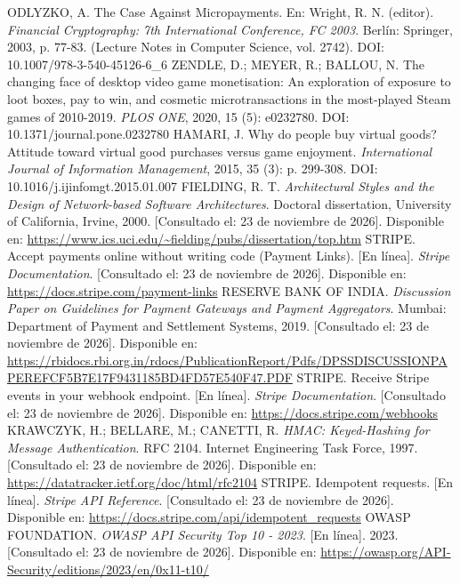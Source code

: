 \documentclass[12pt]{article}
\makeatletter
\newcommand\onceUnoQuince{\fontsize{11bp}{14.5475bp}\selectfont}  %
\newenvironment{referencias}{%
  \list{\@biblabel{\@arabic\c@enumiv}}{%
    \settowidth\labelwidth{[99]}%
    \leftmargin\labelwidth \advance\leftmargin\labelsep
    \itemsep=4bp \parsep=0pt \topsep=0pt \partopsep=0pt
    \usecounter{enumiv}\let\p@enumiv\@empty
    \renewcommand\theenumiv{\@arabic\c@enumiv}}%
  \onceUnoQuince \sloppy}{\endlist}
\makeatother
\begin{document}
\begin{referencias}
 ODLYZKO, A. The Case Against Micropayments. En: Wright, R. N. (editor). \textit{Financial Cryptography: 7th International Conference, FC 2003}. Berlín: Springer, 2003, p. 77-83. (Lecture Notes in Computer Science, vol. 2742). DOI: 10.1007/978-3-540-45126-6\_6
 ZENDLE, D.; MEYER, R.; BALLOU, N. The changing face of desktop video game monetisation: An exploration of exposure to loot boxes, pay to win, and cosmetic microtransactions in the most-played Steam games of 2010-2019. \textit{PLOS ONE}, 2020, 15 (5): e0232780. DOI: 10.1371/journal.pone.0232780
 HAMARI, J. Why do people buy virtual goods? Attitude toward virtual good purchases versus game enjoyment. \textit{International Journal of Information Management}, 2015, 35 (3): p. 299-308. DOI: 10.1016/j.ijinfomgt.2015.01.007
 FIELDING, R. T. \textit{Architectural Styles and the Design of Network-based Software Architectures}. Doctoral dissertation, University of California, Irvine, 2000. [Consultado el: 23 de noviembre de 2026]. Disponible en: \url{https://www.ics.uci.edu/~fielding/pubs/dissertation/top.htm}
 STRIPE. Accept payments online without writing code (Payment Links). [En línea]. \textit{Stripe Documentation}. [Consultado el: 23 de noviembre de 2026]. Disponible en: \url{https://docs.stripe.com/payment-links}
 RESERVE BANK OF INDIA. \textit{Discussion Paper on Guidelines for Payment Gateways and Payment Aggregators}. Mumbai: Department of Payment and Settlement Systems, 2019. [Consultado el: 23 de noviembre de 2026]. Disponible en: \url{https://rbidocs.rbi.org.in/rdocs/PublicationReport/Pdfs/DPSSDISCUSSIONPAPEREFCF5B7E17F9431185BD4FD57E540F47.PDF}
 STRIPE. Receive Stripe events in your webhook endpoint. [En línea]. \textit{Stripe Documentation}. [Consultado el: 23 de noviembre de 2026]. Disponible en: \url{https://docs.stripe.com/webhooks}
 KRAWCZYK, H.; BELLARE, M.; CANETTI, R. \textit{HMAC: Keyed-Hashing for Message Authentication}. RFC 2104. Internet Engineering Task Force, 1997. [Consultado el: 23 de noviembre de 2026]. Disponible en: \url{https://datatracker.ietf.org/doc/html/rfc2104}
 STRIPE. Idempotent requests. [En línea]. \textit{Stripe API Reference}. [Consultado el: 23 de noviembre de 2026]. Disponible en: \url{https://docs.stripe.com/api/idempotent_requests}
 OWASP FOUNDATION. \textit{OWASP API Security Top 10 - 2023}. [En línea]. 2023. [Consultado el: 23 de noviembre de 2026]. Disponible en: \url{https://owasp.org/API-Security/editions/2023/en/0x11-t10/}

\end{referencias}
\end{document}
